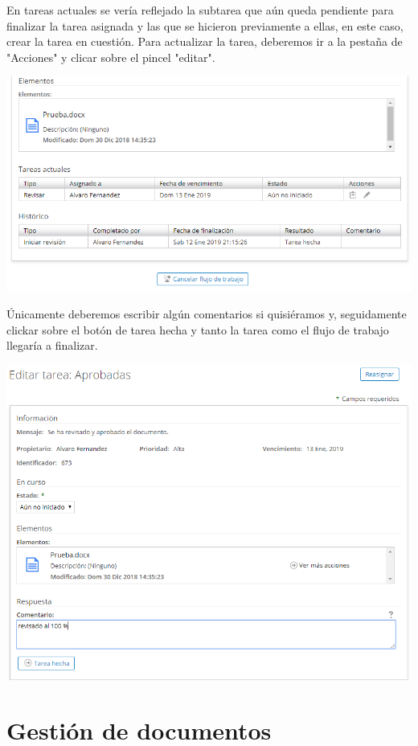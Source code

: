 \documentclass{article}
\begin{document}
En tareas actuales se vería reflejado la subtarea que aún queda pendiente para finalizar la tarea asignada y las que se hicieron previamente a ellas, en este caso, crear la tarea en cuestión.
Para actualizar la tarea, deberemos ir a la pestaña de "Acciones" y clicar sobre el pincel "editar".

\begin{center}
\includegraphics[scale=0.6]{images/editar.png}
\end{center}

Únicamente deberemos escribir algún comentarios si quisiéramos y, seguidamente clickar sobre el botón de tarea hecha y tanto la tarea como el flujo de trabajo llegaría a finalizar.

\begin{center}
\includegraphics[scale=0.6]{images/aprobadas.png}
\end{center}

\section{Gestión de documentos}
\end{document}
